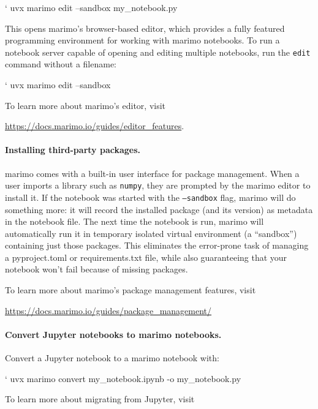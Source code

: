 \documentclass{article}
\begin{document}
\begin{shellcmd}
` uvx marimo edit --sandbox my_notebook.py
\end{shellcmd}
This opens marimo's browser-based editor, which provides a fully featured programming
environment for working with marimo notebooks. To run a notebook server capable
of opening and editing multiple notebooks, run the \texttt{edit} command
without a filename:

\begin{shellcmd}
` uvx marimo edit --sandbox 
\end{shellcmd}
To learn more about marimo's editor, visit

\begin{center}
  \url{https://docs.marimo.io/guides/editor_features}.
\end{center}


\paragraph{Installing third-party packages.}
marimo comes with a built-in user interface for package management. When a user imports
a library such as \texttt{numpy}, they are prompted by the marimo editor to install it. If the notebook
was started with the \texttt{--sandbox} flag, marimo will do something more: it will
record the installed package (and its version) as metadata in the notebook file.
The next time the notebook is run, marimo will automatically run it in temporary
isolated virtual environment (a ``sandbox'') containing just those packages.
This eliminates the error-prone task of managing a pyproject.toml or
requirements.txt file, while also guaranteeing that your notebook won't
fail because of missing packages.

To learn more about marimo's package management features, visit

\begin{center}
\url{https://docs.marimo.io/guides/package_management/}
\end{center}

\paragraph{Convert Jupyter notebooks to marimo notebooks.} Convert a Jupyter notebook
to a marimo notebook with:

\begin{shellcmd}
` uvx marimo convert my_notebook.ipynb -o my_notebook.py
\end{shellcmd}
To learn more about migrating from Jupyter, visit
\end{document}
